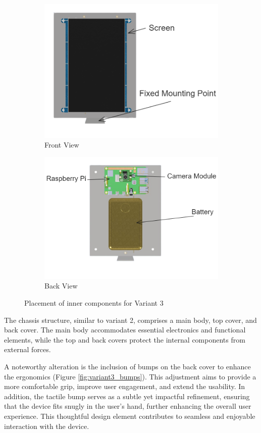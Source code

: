 \begin{figure}[h!]
    \centering
    \begin{subfigure}[c]{0.47\textwidth}
        \begin{minipage}{\textwidth}
            \centering
            \includegraphics[height=4 cm]{texs/Part1/chapter4/image/v32.png}
        \end{minipage}
        \caption{Front View}
        \label{fig:variant3_front_components}
    \end{subfigure}
    \begin{subfigure}[c]{0.5\textwidth}
        \begin{minipage}{\textwidth}
            \centering
            \includegraphics[height=4 cm]{texs/Part1/chapter4/image/v33.png}
        \end{minipage}
        \caption{Back View}
        \label{fig:variant3_back_components}
    \end{subfigure}
    \caption{Placement of inner components for Variant 3}
    \label{fig:variant3_inner_components}
\end{figure}

The chassis structure, similar to variant 2, comprises a main body, top cover, and back cover. The main body accommodates essential electronics and functional elements, while the top and back covers protect the internal components from external forces.

A noteworthy alteration is the inclusion of bumps on the back cover to enhance the ergonomics (Figure \ref{fig:variant3_bumps}). This adjustment aims to provide a more comfortable grip, improve user engagement, and extend the usability. In addition, the tactile bump serves as a subtle yet impactful refinement, ensuring that the device fits snugly in the user's hand, further enhancing the overall user experience. This thoughtful design element contributes to seamless and enjoyable interaction with the device.

